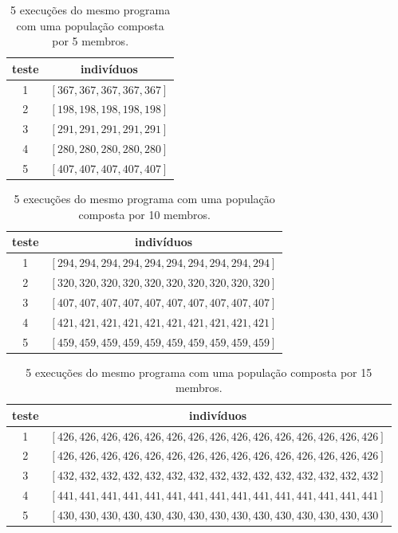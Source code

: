 \documentclass[11pt]{article}
\begin{document}
\begin{table}[h]
\centering
\begin{tabular}{cc}
 teste & indivíduos \\ 
 \midrule 
 1 & $[367, 367, 367, 367, 367]$ \\ 
 2 & $[198, 198, 198, 198, 198]$ \\ 
 3 & $[291, 291, 291, 291, 291]$ \\ 
 4 & $[280, 280, 280, 280, 280]$ \\ 
 5 & $[407, 407, 407, 407, 407]$ \\
 \bottomrule
\end{tabular}\caption{5 execuções do mesmo programa com uma população composta por 5 membros.}
\end{table}

\begin{table}[h]
\centering
\begin{tabular}{cc}
 teste & indivíduos \\ 
 \midrule 
 1 & $[294, 294, 294, 294, 294, 294, 294, 294, 294, 294]$ \\ 
 2 & $[320, 320, 320, 320, 320, 320, 320, 320, 320, 320]$ \\ 
 3 & $[407, 407, 407, 407, 407, 407, 407, 407, 407, 407]$ \\ 
 4 & $[421, 421, 421, 421, 421, 421, 421, 421, 421, 421]$ \\ 
 5 & $[459, 459, 459, 459, 459, 459, 459, 459, 459, 459]$ \\
 \bottomrule
\end{tabular}\caption{5 execuções do mesmo programa com uma população composta por 10 membros.}
\end{table}

\begin{table}[h]
\centering
\begin{tabular}{cc}
 teste & indivíduos \\ 
 \midrule 
 1 & $[426, 426, 426, 426, 426, 426, 426, 426, 426, 426, 426, 426, 426, 426, 426]$ \\ 
 2 & $[426, 426, 426, 426, 426, 426, 426, 426, 426, 426, 426, 426, 426, 426, 426]$ \\ 
 3 & $[432, 432, 432, 432, 432, 432, 432, 432, 432, 432, 432, 432, 432, 432, 432]$ \\ 
 4 & $[441, 441, 441, 441, 441, 441, 441, 441, 441, 441, 441, 441, 441, 441, 441]$ \\ 
 5 & $[430, 430, 430, 430, 430, 430, 430, 430, 430, 430, 430, 430, 430, 430, 430]$ \\
 \bottomrule
\end{tabular}\caption{5 execuções do mesmo programa com uma população composta por 15 membros.}
\end{table}
\end{document}
